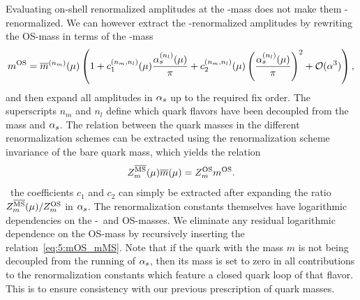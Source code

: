 Evaluating on-shell renormalized amplitudes at the \MS-mass does not make them \MS-renormalized. We can however extract the \MS-renormalized amplitudes by rewriting the \acs{OS}-mass in terms of the \MS-mass
\begin{equation}
m^{\text{OS}}  = \overline{m}^{(n_m)}(\mu) \left(1 + c_1^{(n_m,n_l)} (\mu) \frac{\alpha_s^{(n_l)}(\mu)}{\pi} + c_2^{(n_m, n_l)}(\mu) \left( \frac{\alpha_s^{(n_l)}(\mu)}{\pi} \right)^2 + \mathcal{O}(\alpha^3)\right),
\label{eq:5:mOS_mMS}
\end{equation}
and then expand all amplitudes in $\alpha_s$ up to the required fix order. The superscripts $n_m$ and $n_l$ define which quark flavors have been decoupled from the mass and $\alpha_s$. The relation between the quark masses in the different renormalization schemes can be extracted using the renormalization scheme invariance of the bare quark mass, which yields the relation
\begin{equation}
Z_m^{\overline{\mathrm{MS}}}(\mu) \overline{m}(\mu) = Z_m^{\text{OS}} m^{\text{OS}}.
\end{equation}
\Ie\ the coefficients $c_1$ and $c_2$ can simply be extracted after expanding the ratio $Z_m^{\overline{\mathrm{MS}}}(\mu)/Z_m^{\text{OS}}$ in $\alpha_s$. The renormalization constants themselves have logarithmic dependencies on the \MS-\ and \acs{OS}-masses. We eliminate any residual logarithmic dependence on the \acs{OS}-mass by recursively inserting the relation~\eqref{eq:5:mOS_mMS}. Note that if the quark with the mass $m$ is not being decoupled from the running of $\alpha_s$, then its mass is set to zero in all contributions to the renormalization constants which feature a closed quark loop of that flavor. This is to ensure consistency with our previous prescription of quark masses.

